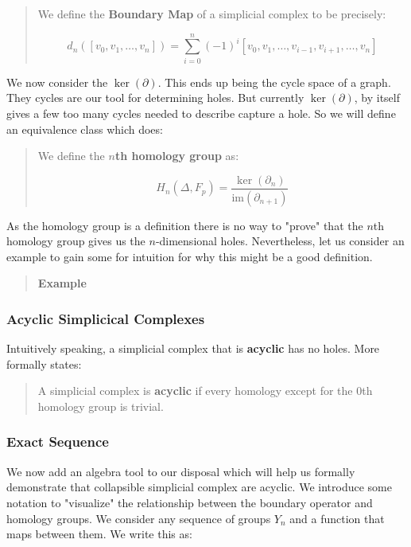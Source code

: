 \documentclass[letterpaper,12pt]{article}
\begin{document}
\begin{quote}
    We define the \textbf{Boundary Map} of a simplicial complex to be precisely:
    
    $$d_n([v_0,v_1,\ldots,v_n]) = \sum_{i=0}^n (-1)^i[v_0,v_1,\ldots,v_{i-1},v_{i+1},\ldots,v_n ]$$
\end{quote}

We now consider the $\ker(\partial)$. This ends up being the cycle space of a graph. They cycles are our tool for determining holes. But currently $\ker(\partial)$, by itself gives a few too many cycles needed to describe capture a hole. So we will define an equivalence class which does:

\begin{quote}
    We define the $n$\textbf{th homology group} as:

    $$H_n(\Delta, F_p) = \frac{\ker(\partial_n)}{\text{im}(\partial_{n+1})}$$
\end{quote}

As the homology group is a definition there is no way to "prove" that the $n$th homology group gives us the $n$-dimensional holes. Nevertheless, let us consider an example to gain some for intuition for why this might be a good definition.

\begin{quote}
    \textbf{Example}
\end{quote}

\begin{quote}
\end{quote}

\subsubsection{Acyclic Simplicical Complexes}

Intuitively speaking, a simplicial complex that is \textbf{acyclic} has no holes. More formally states:

\begin{quote}
    A simplicial complex is \textbf{acyclic} if every homology except for the $0$th homology group is trivial.
\end{quote}

\subsubsection{Exact Sequence}

We now add an algebra tool to our disposal which will help us formally demonstrate that collapsible simplicial complex are acyclic. We introduce some notation to "visualize" the relationship between the boundary operator and homology groups. We consider any sequence of groups $Y_n$ and a function that maps between them. We write this as:
\end{document}
